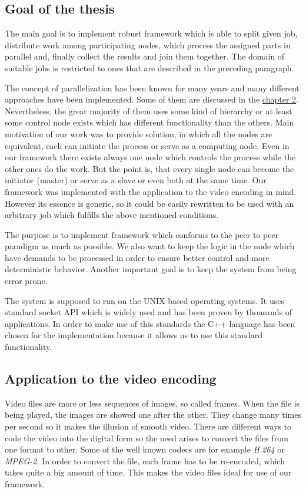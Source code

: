 \subsection*{Goal of the thesis} %
The main goal is to implement robust framework which is able to split given job, distribute work among participating nodes, which process the assigned parts in parallel and, finally collect the results and join them together. The domain of suitable jobs is restricted to ones that are described in the preceding paragraph.

The concept of parallelization has been known for many years and many different approaches have been implemented. Some of them are discussed in the \hyperref[installation-and-use]{chapter 2}. Nevertheless, the great majority of them uses some kind of hierarchy or at least some control node exists which has different functionality than the others. Main motivation of our work was to provide solution, in which all the nodes are equivalent, each can initiate the process or serve as a computing node. Even in our framework there exists always one node which controls the process while the other ones do the work. But the point is, that every single node can become the initiator (master) or serve as a slave or even both at the same time. Our framework was implemented with the application to the video encoding in mind. However its essence is generic, so it could be easily rewritten to be used with an arbitrary job which fulfills the above mentioned conditions.

The purpose is to implement framework which conforms to the peer to peer paradigm as much as possible. We also want to keep the logic in the node which have demands to be processed in order to ensure better control and more deterministic behavior. Another important goal is to keep the system from being error prone.

The system is supposed to run on the UNIX based operating systems. It uses standard socket API which is widely used and has been proven by thousands of applications. In order to make use of this standards the C++ language has been chosen for the implementation because it allows us to use this standard functionality.

\subsection*{Application to the video encoding}
Video files are more or less sequences of images, so called frames. When the file is being played, the images are showed one after the other. They change many times per second so it makes the illusion of smooth video. There are different ways to code the video into the digital form so the need arises to convert the files from one format to other. Some of the well known codecs are for example \textit{H.264} or \textit{MPEG-2}. In order to convert the file, each frame has to be re-encoded, which takes quite a big amount of time. This makes the video files ideal for use of our framework.

